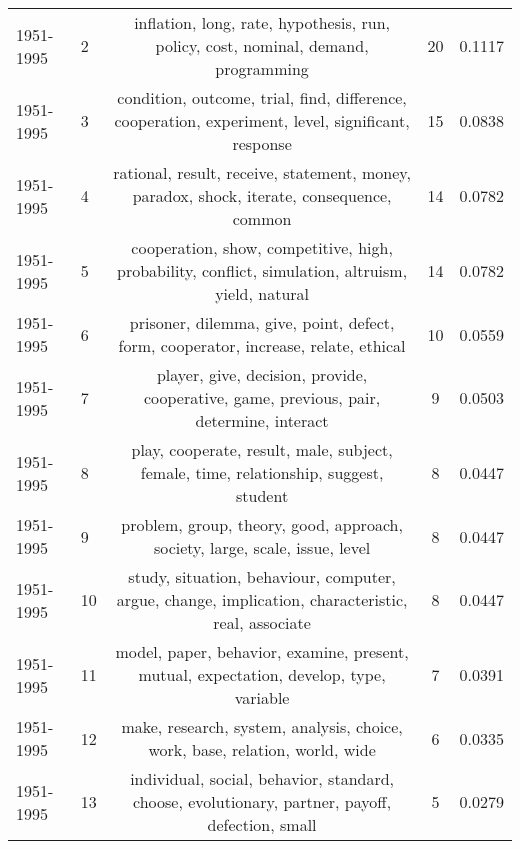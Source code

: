 \begin{tabular}{llccc}
 1951-1995 &               2 &                            inflation, long, rate, hypothesis, run, policy, cost, nominal, demand, programming &               20 &                  0.1117 \\
 1951-1995 &               3 &            condition, outcome, trial, find, difference, cooperation, experiment, level, significant, response &               15 &                  0.0838 \\
 1951-1995 &               4 &                     rational, result, receive, statement, money, paradox, shock, iterate, consequence, common &               14 &                  0.0782 \\
 1951-1995 &               5 &             cooperation, show, competitive, high, probability, conflict, simulation, altruism, yield, natural &               14 &                  0.0782 \\
 1951-1995 &               6 &                           prisoner, dilemma, give, point, defect, form, cooperator, increase, relate, ethical &               10 &                  0.0559 \\
 1951-1995 &               7 &                       player, give, decision, provide, cooperative, game, previous, pair, determine, interact &                9 &                  0.0503 \\
 1951-1995 &               8 &                          play, cooperate, result, male, subject, female, time, relationship, suggest, student &                8 &                  0.0447 \\
 1951-1995 &               9 &                                   problem, group, theory, good, approach, society, large, scale, issue, level &                8 &                  0.0447 \\
 1951-1995 &              10 &            study, situation, behaviour, computer, argue, change, implication, characteristic, real, associate &                8 &                  0.0447 \\
 1951-1995 &              11 &                        model, paper, behavior, examine, present, mutual, expectation, develop, type, variable &                7 &                  0.0391 \\
 1951-1995 &              12 &                                   make, research, system, analysis, choice, work, base, relation, world, wide &                6 &                  0.0335 \\
 1951-1995 &              13 &               individual, social, behavior, standard, choose, evolutionary, partner, payoff, defection, small &                5 &                  0.0279 \\

\end{tabular}
